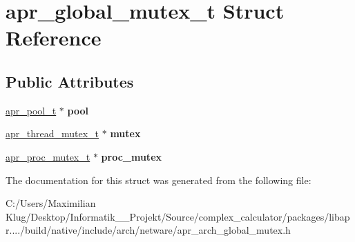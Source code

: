 \hypertarget{structapr__global__mutex__t}{}\section{apr\+\_\+global\+\_\+mutex\+\_\+t Struct Reference}
\label{structapr__global__mutex__t}
\subsection*{Public Attributes}
\begin{DoxyCompactItemize}
\item 
\mbox{\label{structapr__global__mutex__t_a9503c0abf18f7b498ecbf4233eefbcd8}} 
\mbox{\hyperlink{group__apr__pools_gaf137f28edcf9a086cd6bc36c20d7cdfb}{apr\+\_\+pool\+\_\+t}} $\ast$ {\bfseries pool}
\item 
\mbox{\label{structapr__global__mutex__t_a0464d8cc4d113c844588bf0fb98f7fa9}} 
\mbox{\hyperlink{structapr__thread__mutex__t}{apr\+\_\+thread\+\_\+mutex\+\_\+t}} $\ast$ {\bfseries mutex}
\item 
\mbox{\label{structapr__global__mutex__t_a0b19e0f205f5cb03ec7e7f334c7dbce8}} 
\mbox{\hyperlink{structapr__proc__mutex__t}{apr\+\_\+proc\+\_\+mutex\+\_\+t}} $\ast$ {\bfseries proc\+\_\+mutex}
\end{DoxyCompactItemize}


The documentation for this struct was generated from the following file\+:\begin{DoxyCompactItemize}
\item 
C\+:/\+Users/\+Maximilian Klug/\+Desktop/\+Informatik\+\_\+\_\+\+Projekt/\+Source/complex\+\_\+calculator/packages/libapr..../build/native/include/arch/netware/apr\+\_\+arch\+\_\+global\+\_\+mutex.\+h\end{DoxyCompactItemize}
